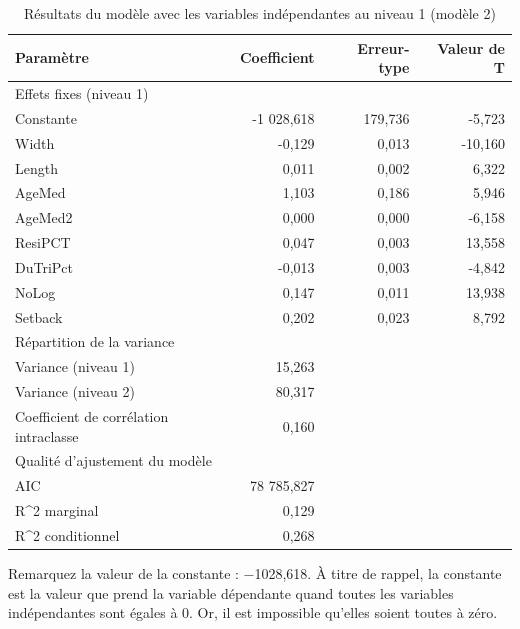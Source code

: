 \documentclass[
  11pt,
  french,
]{book}
\begin{document}
\begin{table}

\caption{\label{tab:TableauModele2}Résultats du modèle avec les variables indépendantes au niveau 1 (modèle 2)}
\centering
\fontsize{8}{10}\selectfont
\begin{tabular}[t]{lrrr}
\toprule
Paramètre & Coefficient & Erreur-type & Valeur de T\\
\midrule
Effets fixes (niveau 1) &  &  & \\
Constante & -1 028,618 & 179,736 & -5,723\\
Width & -0,129 & 0,013 & -10,160\\
Length & 0,011 & 0,002 & 6,322\\
AgeMed & 1,103 & 0,186 & 5,946\\
\addlinespace
AgeMed2 & 0,000 & 0,000 & -6,158\\
ResiPCT & 0,047 & 0,003 & 13,558\\
DuTriPct & -0,013 & 0,003 & -4,842\\
NoLog & 0,147 & 0,011 & 13,938\\
Setback & 0,202 & 0,023 & 8,792\\
\addlinespace
Répartition de la variance &  &  & \\
Variance (niveau 1) & 15,263 &  & \\
Variance (niveau 2) & 80,317 &  & \\
Coefficient de corrélation intraclasse & 0,160 &  & \\
Qualité d'ajustement du modèle &  &  & \\
\addlinespace
AIC & 78 785,827 &  & \\
R\textasciicircum{2} marginal & 0,129 &  & \\
R\textasciicircum{2} conditionnel & 0,268 &  & \\
\bottomrule
\end{tabular}
\end{table}

Remarquez la valeur de la constante : −1028,618. À titre de rappel, la constante est la valeur que prend la variable dépendante quand toutes les variables indépendantes sont égales à 0. Or, il est impossible qu'elles soient toutes à zéro.
\end{document}
